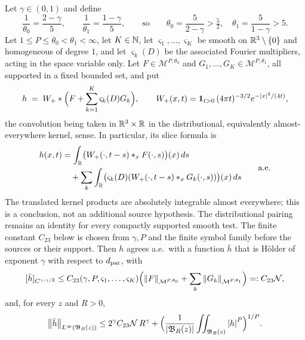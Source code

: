 \documentclass[11pt,reqno]{amsart}
\begin{document}
\begin{proposition}
\label{prop:heat-morrey-hoelder}
Let $\gamma\in(0,1)$ and define
\begin{equation}\label{eq:q0q1}
  \frac1{\theta_{0}}=\frac{2-\gamma}{5},\qquad
  \frac1{\theta_{1}}=\frac{1-\gamma}{5},
  \qquad\text{so}\qquad \theta_{0}=\frac{5}{2-\gamma}>\tfrac52,
  \quad\theta_{1}=\frac{5}{1-\gamma}>5 .
\end{equation}
Let $1\le P\le\theta_{0}<\theta_{1}<\infty$, let $K\in\mathbb{N}$, let
$\varsigma_{1},\dots,\varsigma_{K}$ be smooth on $\mathbb{R}^{3}\setminus\{0\}$ and
homogeneous of degree $1$, and let $\varsigma_{k}(D)$ be the associated Fourier
multipliers, acting in the space variable only. Let
$F\in\mathcal{M}^{P,\theta_{0}}$ and $G_{1},\dots,G_{K}\in\mathcal{M}^{P,\theta_{1}}$,
all supported in a fixed bounded set, and put
\begin{equation}\label{eq:heat-potential}
  h \;=\; W_{+}*\Bigl(F+\sum_{k=1}^{K}\varsigma_{k}(D)G_{k}\Bigr),
  \qquad W_{+}(x,t)=\mathbf{1}_{t>0}\,(4\pi t)^{-3/2}e^{-\left\lvert x \right\rvert^{2}/(4t)} ,
\end{equation}
the convolution being taken in $\mathbb{R}^{3}\times\mathbb{R}$ in the distributional,
equivalently almost-everywhere kernel, sense. In particular, its slice
formula is
\[
 \begin{aligned}
 h(x,t)&=\int_{\mathbb{R}}\bigl(W_+(\cdot,t-s)*_x F(\cdot,s)\bigr)(x)\,ds\\
 &\quad+\sum_k\int_{\mathbb{R}}
   \bigl(\varsigma_k(D)(W_+(\cdot,t-s)*_xG_k(\cdot,s))\bigr)(x)\,ds
 \end{aligned}
 \qquad\text{a.e.}
\]
The translated kernel products are absolutely integrable almost everywhere;
this is a conclusion, not an additional source hypothesis. The
distributional pairing remains an identity for every compactly supported
smooth test. The finite constant $C_{23}$ below is chosen from
$\gamma,P$ and the finite symbol family before the sources or their support.
Then $h$ agrees a.e.\ with a
function $\bar h$ that is H\"older of exponent $\gamma$ with respect to
$d_{\mathrm{par}}$, with
\begin{equation}\label{eq:heat-hoelder}
  [\bar h]_{C^{\gamma,\gamma/2}}\le C_{23}(\gamma,P,\varsigma_{1},\dots,\varsigma_{K})
     \Bigl(\left\lVert F \right\rVert_{\mathcal{M}^{P,\theta_{0}}}
          +\sum_{k}\left\lVert G_{k} \right\rVert_{\mathcal{M}^{P,\theta_{1}}}\Bigr)=:C_{23}\mathcal{N},
\end{equation}
and, for every $z$ and $R>0$,
\begin{equation}\label{eq:heat-Linfty}
  \left\lVert \bar h \right\rVert_{L^{\infty}(\mathfrak{B}_{R}(z))}
  \le 2^{\gamma}C_{23}\mathcal{N}\,R^{\gamma}
   +\Bigl(\frac1{\left\lvert \mathfrak{B}_{R}(z) \right\rvert}\iint_{\mathfrak{B}_{R}(z)}
      \left\lvert h \right\rvert^{P}\Bigr)^{1/P}.
\end{equation}
\end{proposition}
\end{document}

